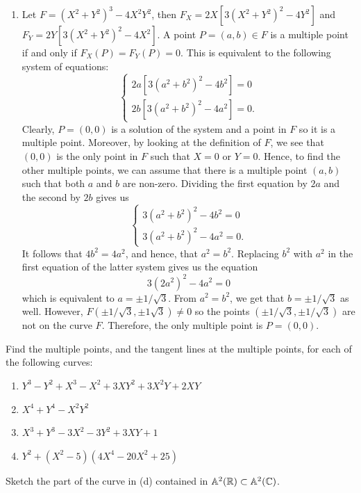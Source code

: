\begin{solution}
\begin{enumerate}
        $$4a^2 + 4b^2 + 6b = 0$$
        which is the same as
        $$a^2 = -\frac{1}{2}(2b^2 + 3b).$$
        Replacing $a^2$ in the second equation with the expression above gives us
        $$b = -9/22$$
        after making some simplifications. It follows that $a = 54/121$, and hence, we get the point $(54/121, -9/22)$. However, this point is not in $F$. Therefore, the only multiple point is $P = (0,0)$. 
        \item Let $F = (X^2 + Y^2)^3 - 4X^2Y^2$, then $F_X = 2X[3(X^2 + Y^2)^2 - 4Y^2]$ and $F_Y = 2Y[3(X^2 + Y^2)^2 - 4X^2]$. A point $P = (a,b) \in F$ is a multiple point if and only if $F_X(P) = F_Y(P) = 0$. This is equivalent to the following system of equations:
        $$\begin{cases}
            2a[3(a^2 + b^2)^2 - 4b^2] = 0 \\
            2b[3(a^2 + b^2)^2 - 4a^2] = 0.
        \end{cases}$$
        Clearly, $P = (0,0)$ is a solution of the system and a point in $F$ so it is a multiple point. Moreover, by looking at the definition of $F$, we see that $(0,0)$ is the only point in $F$ such that $X = 0$ or $Y = 0$. Hence, to find the other multiple points, we can assume that there is a multiple point $(a,b)$ such that both $a$ and $b$ are non-zero. Dividing the first equation by $2a$ and the second by $2b$ gives us 
        $$\begin{cases}
            3(a^2 + b^2)^2 - 4b^2 = 0 \\
            3(a^2 + b^2)^2 - 4a^2 = 0.
        \end{cases}$$
        It follows that $4b^2 = 4a^2$, and hence, that $a^2 = b^2$. Replacing $b^2$ with $a^2$ in the first equation of the latter system gives us the equation
        $$3(2a^2)^2 - 4a^2 = 0$$
        which is equivalent to $a = \pm 1/\sqrt{3}$. From $a^2 = b^2$, we get that $b = \pm 1/\sqrt{3}$ as well. However, $F(\pm1/\sqrt{3}, \pm 1\sqrt{3}) \neq 0$ so the points $(\pm 1 / \sqrt{3}, \pm 1/\sqrt{3})$ are not on the curve $F$. Therefore, the only multiple point is $P = (0,0)$. \\
    \end{enumerate}
\end{solution}

\begin{exercise}
    Find the multiple points, and the tangent lines at the multiple points, for each of the following curves:
    \begin{enumerate}
        \item $Y^3 - Y^2 + X^3 - X^2 + 3XY^2 + 3X^2Y + 2XY$
        \item $X^4 + Y^4 - X^2Y^2$
        \item $X^3 + Y^3 - 3X^2 - 3Y^2 + 3XY + 1$
        \item $Y^2 + (X^2 - 5)(4X^4 - 20X^2 + 25)$
    \end{enumerate}
    Sketch the part of the curve in (d) contained in $\mathbb{A}^2(\mathbb{R}) \subset \mathbb{A}^2(\mathbb{C})$. \\
\end{exercise}

